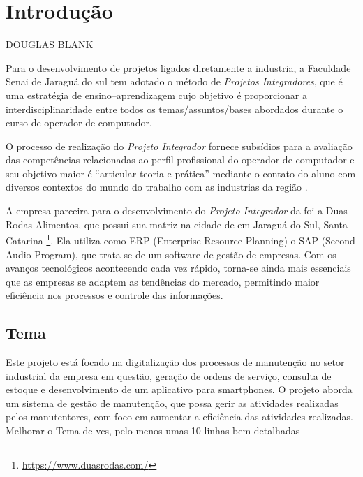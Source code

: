 
\chapter{Introdução}

{\color{red}
	
DOUGLAS BLANK
	
Para o desenvolvimento de projetos ligados diretamente a industria, a Faculdade Senai de Jaraguá do sul tem adotado o método de \textit{Projetos Integradores}, que é uma estratégia de ensino–aprendizagem cujo objetivo é proporcionar a interdisciplinaridade entre todos os temas/assuntos/bases abordados durante o curso de operador de computador.

O processo de realização do \textit{Projeto Integrador} fornece subsídios para a avaliação das competências relacionadas ao perfil profissional do operador de computador e seu objetivo maior é “articular teoria e prática” mediante o contato do aluno com diversos contextos do mundo do trabalho com as industrias da região \cite{magalhaes2019uso}.  

A empresa parceira para o desenvolvimento do \textit{Projeto Integrador} da foi a Duas Rodas Alimentos,  que  possui sua matriz na cidade de  em Jaraguá do Sul, Santa Catarina  \footnote{\url{ https://www.duasrodas.com/}}.  Ela utiliza como ERP (Enterprise Resource Planning) o SAP (Second Audio Program), que trata-se de um software de gestão de empresas.
Com os avanços tecnológicos acontecendo cada vez rápido, torna-se ainda mais essenciais que as empresas se adaptem as tendências do mercado, permitindo maior eficiência nos processos e controle das informações.

}
% 


\section{Tema}
Este projeto está focado na digitalização dos processos de manutenção no setor industrial da empresa em questão, geração de ordens de serviço, consulta de estoque e desenvolvimento de um aplicativo para smartphones. O projeto aborda um sistema de gestão de manutenção, que possa gerir as atividades realizadas pelos manutentores, com foco em aumentar a eficiência das atividades realizadas.
{\color{red} Melhorar o Tema de vcs, pelo menos umas 10 linhas bem detalhadas}
